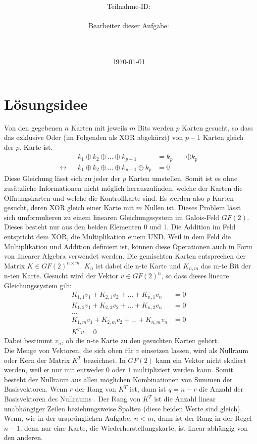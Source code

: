 \documentclass[a4paper,10pt,ngerman]{scrartcl}
\title{\textbf{\Huge\Aufgabe}}
\author{\LARGE Teilnahme-ID: \LARGE \TeamId \\\\
	    \LARGE Bearbeiter dieser Aufgabe: \\ 
	    \LARGE \Namen\\\\}
\date{\LARGE\today}
\newcommand*\xor{\oplus}
\begin{document}
\maketitle
\tableofcontents

\vspace{0.5cm}



\section{Lösungsidee}
Von den gegebenen $n$ Karten mit jeweils $m$ Bits werden $p$ Karten gesucht, so dass das exklusive Oder (im Folgenden als XOR abgekürzt) von $p-1$ Karten gleich der $p.$ Karte ist.
\begin{align*}
&& k_1 \xor k_2 \xor \ldots \xor k_{p-1} &= k_p && |\xor k_p \\
\leftrightarrow && k_1 \xor k_2 \xor \ldots \xor k_{p-1} \xor k_p &= 0 &&
\end{align*}
Diese Gleichung lässt sich zu jeder der $p$ Karten umstellen. Somit ist es ohne zusätzliche Informationen nicht möglich herauszufinden, welche der Karten die Öffnungskarten und welche die Kontrollkarte sind. Es werden also $p$ Karten gesucht, deren XOR gleich einer Karte mit $m$ Nullen ist. Dieses Problem lässt sich umformulieren zu einem linearen Gleichungssystem im Galois-Feld $GF(2)$. Dieses besteht nur aus den beiden Elementen 0 und 1. Die Addition im Feld entspricht dem XOR, die Multiplikation einem UND. Weil in dem Feld die Multiplikation und Addition definiert ist, können diese Operationen auch in Form von linearer Algebra verwendet werden. Die gemischten Karten entsprechen der Matrix $K \in GF(2)^{n \times m}$. $K_n$ ist dabei die n-te Karte und $K_{n,m}$ das m-te Bit der n-ten Karte. Gesucht wird der Vektor $v \in GF(2)^n$, so dass dieses lineare Gleichungssystem gilt:
\begin{align*}
K_{1, 1} v_1 + K_{2, 1} v_2 + \ldots + K_{n, 1} v_n &= 0 \\
K_{1, 2} v_1 + K_{2, 2} v_2 + \ldots + K_{n, 2} v_n &= 0 \\
\ldots \\
K_{1, m} v_1 + K_{2, m} v_2 + \ldots + K_{n, m} v_n &= 0 \\ 
K^T v = 0
\end{align*}
Dabei bestimmt $v_n$, ob die n-te Karte zu den gesuchten Karten gehört. \\
Die Menge von Vektoren, die sich oben für $v$ einsetzen lassen, wird als Nullraum oder Kern der Matrix $K^T$ bezeichnet. In $GF(2)$ kann ein Vektor nicht skaliert werden, weil er nur mit entweder $0$ oder $1$ multipliziert werden kann. Somit besteht der Nullraum aus allen möglichen Kombinationen von Summen der Basisvektoren. Wenn $r$ der Rang von $K^T$ ist, dann ist $q=n-r$ die Anzahl der Basisvektoren des Nullraums \cite[S. 63]{Axler2014}. Der Rang von $K^T$ ist die Anzahl linear unabhängiger Zeilen beziehungsweise Spalten (diese beiden Werte sind gleich). Wenn, wie in der ursprünglichen Aufgabe, $n<m$, dann ist der Rang in der Regel $n-1$, denn nur eine Karte, die Wiederherstellungskarte, ist linear abhängig von den anderen. \\
\end{document}
